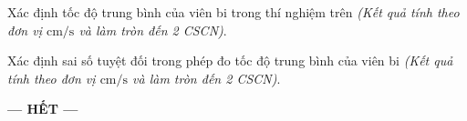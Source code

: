 \begin{ex}
	Xác định tốc độ trung bình của viên bi trong thí nghiệm trên \textit{(Kết quả tính theo đơn vị $\si{\centi\meter/\second}$ và làm tròn đến 2 CSCN)}.
\end{ex}
\begin{ex}
	Xác định sai số tuyệt đối trong phép đo tốc độ trung bình của viên bi \textit{(Kết quả tính theo đơn vị $\si{\centi\meter/\second}$ và làm tròn đến 2 CSCN)}.
\end{ex}
\begin{center}
	\textbf{--- HẾT ---}
\end{center}